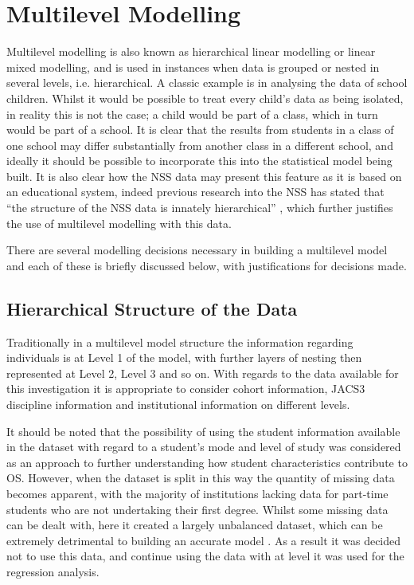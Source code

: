 \documentclass[11pt,a4paper]{report}
\begin{document}
\section{Multilevel Modelling} \label{methodMLM}
Multilevel modelling is also known as hierarchical linear modelling or linear mixed modelling, and is used in instances when data is grouped or nested in several levels, i.e. hierarchical. A classic example is in analysing the data of school children. Whilst it would be possible to treat every child's data as being isolated, in reality this is not the case; a child would be part of a class, which in turn would be part of a school. It is clear that the results from students in a class of one school may differ substantially from another class in a different school, and ideally it should be possible to incorporate this into the statistical model being built. It is also clear how the NSS data may present this feature as it is based on an educational system, indeed previous research into the NSS has stated that ``the structure of the NSS data is innately hierarchical'' \cite{surridge2005-2007}, which further justifies the use of multilevel modelling with this data. 

There are several modelling decisions necessary in building a multilevel model and each of these is briefly discussed below, with justifications for decisions made.

\subsection{Hierarchical Structure of the Data}
Traditionally in a multilevel model structure the information regarding individuals is at Level 1 of the model, with further layers of nesting then represented at Level 2, Level 3 and so on. With regards to the data available for this investigation it is appropriate to consider cohort information, JACS3 discipline information and institutional information on different levels. 

It should be noted that the possibility of using the student information available in the dataset with regard to a student's mode and level of study was considered as an approach to further understanding how student characteristics contribute to OS. However, when the dataset is split in this way the quantity of missing data becomes apparent, with the majority of institutions lacking data for part-time students who are not undertaking their first degree. Whilst some missing data can be dealt with, here it created a largely unbalanced dataset, which can be extremely detrimental to building an accurate model \cite{AppliedMLAnalysis}. As a result it was decided not to use this data, and continue using the data with at level it was used for the regression analysis. 
\end{document}
